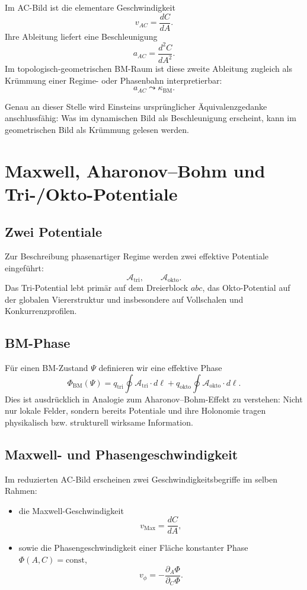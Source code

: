 \documentclass[11pt,a4paper]{article}
\theoremstyle{definition}
\theoremstyle{plain}
\begin{document}
	Im AC-Bild ist die elementare Geschwindigkeit
	\[
	v_{AC}=\frac{dC}{dA}.
	\]
	Ihre Ableitung liefert eine Beschleunigung
	\[
	a_{AC}=\frac{d^2 C}{dA^2}.
	\]
	Im topologisch-geometrischen BM-Raum ist diese zweite Ableitung zugleich als Krümmung einer Regime- oder Phasenbahn interpretierbar:
	\[
	a_{AC}\leadsto \kappa_{\mathrm{BM}}.
	\]
	
	Genau an dieser Stelle wird Einsteins ursprünglicher Äquivalenzgedanke anschlussfähig: Was im dynamischen Bild als Beschleunigung erscheint, kann im geometrischen Bild als Krümmung gelesen werden.
	
	\section{Maxwell, Aharonov--Bohm und Tri-/Okto-Potentiale}
	
	\subsection{Zwei Potentiale}
	
	Zur Beschreibung phasenartiger Regime werden zwei effektive Potentiale eingeführt:
	\[
	\mathcal A_{\mathrm{tri}},
	\qquad
	\mathcal A_{\mathrm{okto}}.
	\]
	Das Tri-Potential lebt primär auf dem Dreierblock $abc$, das Okto-Potential auf der globalen Viererstruktur und insbesondere auf Vollschalen und Konkurrenzprofilen.
	
	\subsection{BM-Phase}
	
	Für einen BM-Zustand $\Psi$ definieren wir eine effektive Phase
	\[
	\Phi_{\mathrm{BM}}(\Psi)
	=
	q_{\mathrm{tri}}\oint \mathcal A_{\mathrm{tri}}\cdot d\ell
	+
	q_{\mathrm{okto}}\oint \mathcal A_{\mathrm{okto}}\cdot d\ell.
	\]
	Dies ist ausdrücklich in Analogie zum Aharonov--Bohm-Effekt zu verstehen: Nicht nur lokale Felder, sondern bereits Potentiale und ihre Holonomie tragen physikalisch bzw. strukturell wirksame Information.
	
	\subsection{Maxwell- und Phasengeschwindigkeit}
	
	Im reduzierten AC-Bild erscheinen zwei Geschwindigkeitsbegriffe im selben Rahmen:
	\begin{itemize}[leftmargin=2em]
		\item die Maxwell-Geschwindigkeit
		\[
		v_{\mathrm{Max}} = \frac{dC}{dA},
		\]
		\item sowie die Phasengeschwindigkeit einer Fläche konstanter Phase $\Phi(A,C)=\mathrm{const}$,
		\[
		v_\phi = -\frac{\partial_A \Phi}{\partial_C \Phi}.
		\]
	\end{itemize}
	
\end{document}
